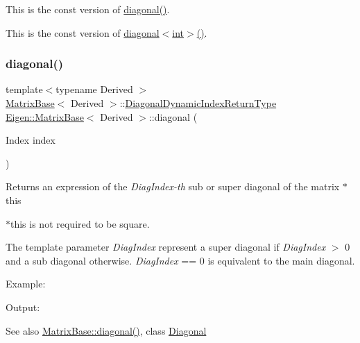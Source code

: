 This is the const version of \mbox{\hyperlink{class_eigen_1_1_matrix_base_ab5768147536273eb2dbdfa389cfd26a3}{diagonal()}}.

This is the const version of \mbox{\hyperlink{class_eigen_1_1_matrix_base_ab5768147536273eb2dbdfa389cfd26a3}{diagonal$<$int$>$()}}. \mbox{\label{class_eigen_1_1_matrix_base_a8a13d4b8efbd7797ee8efd3dd988a7f7}} 
\subsubsection{\texorpdfstring{diagonal()}{diagonal()}\hspace{0.1cm}{\footnotesize\ttfamily [3/4]}}
{\footnotesize\ttfamily template$<$typename Derived $>$ \\
\mbox{\hyperlink{class_eigen_1_1_matrix_base}{Matrix\+Base}}$<$ Derived $>$\+::\mbox{\hyperlink{class_eigen_1_1_diagonal}{Diagonal\+Dynamic\+Index\+Return\+Type}} \mbox{\hyperlink{class_eigen_1_1_matrix_base}{Eigen\+::\+Matrix\+Base}}$<$ Derived $>$\+::diagonal (\begin{DoxyParamCaption}\item[{Index}]{index }\end{DoxyParamCaption})\hspace{0.3cm}{\ttfamily [inline]}}

\begin{DoxyReturn}{Returns}
an expression of the {\itshape Diag\+Index-\/th} sub or super diagonal of the matrix {\ttfamily $\ast$this} 
\end{DoxyReturn}
{\ttfamily $\ast$this} is not required to be square.

The template parameter {\itshape Diag\+Index} represent a super diagonal if {\itshape Diag\+Index} $>$ 0 and a sub diagonal otherwise. {\itshape Diag\+Index} == 0 is equivalent to the main diagonal.

Example\+: 
\begin{DoxyCodeInclude}{0}
\end{DoxyCodeInclude}
 Output\+: 
\begin{DoxyVerbInclude}
\end{DoxyVerbInclude}


\begin{DoxySeeAlso}{See also}
\mbox{\hyperlink{class_eigen_1_1_matrix_base_ab5768147536273eb2dbdfa389cfd26a3}{Matrix\+Base\+::diagonal()}}, class \mbox{\hyperlink{class_eigen_1_1_diagonal}{Diagonal}} 
\end{DoxySeeAlso}
\mbox{\label{class_eigen_1_1_matrix_base_aed11a711c0a3d5dbf8bc094008e29846}} 
